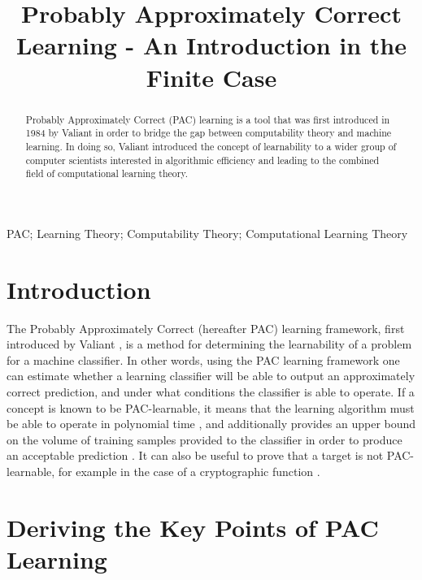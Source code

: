 \documentclass[10pt,conference]{IEEEtran}
\begin{document}
\title{Probably Approximately Correct Learning - An Introduction in the Finite Case\\}

\author{
}

\maketitle

\begin{abstract}
  Probably Approximately Correct (PAC) learning is a tool that was first introduced in 1984 by Valiant in order to bridge the gap between computability theory and machine learning\cite{valiant}. In doing so, Valiant introduced the concept of learnability to a wider group of computer scientists interested in algorithmic efficiency and leading to the combined field of computational learning theory\cite{haussler:}.
\end{abstract}

\begin{IEEEkeywords}
  PAC; Learning Theory; Computability Theory; Computational Learning Theory
\end{IEEEkeywords}


\section{Introduction}
  The Probably Approximately Correct (hereafter PAC) learning framework, first introduced by Valiant \cite{valiant}, is a method for determining the learnability of a problem for a machine classifier. In other words, using the PAC learning framework one can estimate whether a learning classifier will be able to output an approximately correct prediction, and under what conditions the classifier is able to operate. If a concept is known to be PAC-learnable, it means that the learning algorithm must be able to operate in polynomial time \cite{haussler:}, and additionally provides an upper bound on the volume of training samples provided to the classifier in order to produce an acceptable prediction \cite{haussler:}. It can also be useful to prove that a target is not PAC-learnable, for example in the case of a cryptographic function \cite{haussler:}.

\section{Deriving the Key Points of PAC Learning}
\end{document}
